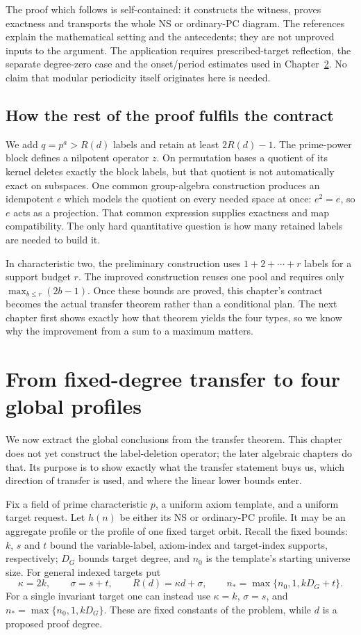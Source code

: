 \documentclass[11pt,a4paper,oneside,openany]{book}
\theoremstyle{definition}\newtheorem{definition}[theorem]{Definition}
\theoremstyle{remark}\newtheorem{remark}[theorem]{Remark}
\numberwithin{equation}{chapter}
\begin{document}
The proof which follows is self-contained: it constructs the witness,
proves exactness and transports the whole NS or ordinary-PC diagram.
The references explain the mathematical setting and the antecedents;
they are not unproved inputs to the argument. The application requires
prescribed-target reflection, the separate degree-zero case and the
onset/period estimates used in Chapter~\ref{tx:ch:profiles}. No claim
that modular periodicity itself originates here is needed.

\section{How the rest of the proof fulfils the contract}
We add $q=p^a>R(d)$ labels and retain at least $2R(d)-1$.
The prime-power block defines a nilpotent operator $z$. On permutation
bases a quotient of its kernel deletes exactly the block labels, but
that quotient is not automatically exact on subspaces. One common
group-algebra construction produces an idempotent $e$ which models the quotient
on every needed space at once: $e^2=e$, so $e$ acts as a projection.
That common expression supplies exactness
and map compatibility. The only hard quantitative question is how many
retained labels are needed to build it.

In characteristic two, the preliminary construction uses $1+2+\cdots+r$ labels for a support
budget $r$. The improved construction reuses one pool and requires only
$\max_{b\le r}(2b-1)$. Once these bounds are proved, this chapter's
contract becomes the actual transfer theorem rather than a conditional
plan. The next chapter first shows exactly how that theorem yields the
four types, so we know why the improvement from a sum to a maximum matters.

\chapter{From fixed-degree transfer to four global profiles}\label{tx:ch:profiles}
We now extract the global conclusions from the transfer theorem. This
chapter does not yet construct the label-deletion operator; the later
algebraic chapters do that. Its purpose is to show exactly what the
transfer statement buys us, which direction of transfer is used, and
where the linear lower bounds enter.

Fix a field of prime characteristic $p$, a uniform axiom template, and
a uniform target request. Let $h(n)$ be either its NS or ordinary-PC
profile. It may be an aggregate profile or the profile of one fixed
target orbit. Recall the fixed bounds: $k$, $s$ and $t$ bound the
variable-label, axiom-index and target-index supports, respectively;
$D_G$ bounds target degree, and $n_0$ is the template's starting universe size.
For general indexed targets put
\[
 \kappa=2k,\qquad \sigma=s+t,\qquad R(d)=\kappa d+\sigma,
 \qquad n_*=\max\{n_0,1,kD_G+t\}.
\]
For a single invariant target one can instead use
$\kappa=k$, $\sigma=s$, and $n_*=\max\{n_0,1,kD_G\}$. These are
fixed constants of the problem, while $d$ is a proposed proof degree.
\end{document}
